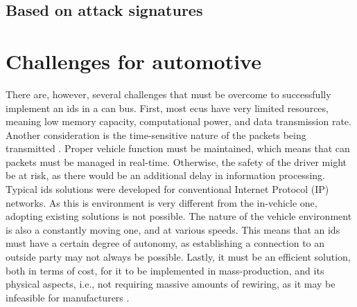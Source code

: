 \subsection{Based on attack signatures}

\section{Challenges for automotive}

There are, however, several challenges that must be overcome to successfully implement an \gls{ids} in a \gls{can} bus. First, most \glspl{ecu} have very limited resources, meaning low memory capacity, computational power, and data transmission rate. Another consideration is the time-sensitive nature of the packets being transmitted \citep{hoppe2009applying}. Proper vehicle function must be maintained, which means that \gls{can} packets must be managed in real-time. Otherwise, the safety of the driver might be at risk, as there would be an additional delay in information processing. Typical \gls{ids} solutions were developed for conventional Internet Protocol (IP) networks. As this is environment is very different from the in-vehicle one, adopting existing solutions is not possible. The nature of the vehicle environment is also a constantly moving one, and at various speeds. This means that an \gls{ids} must have a certain degree of autonomy, as establishing a connection to an outside party may not always be possible. Lastly, it must be an efficient solution, both in terms of cost, for it to be implemented in mass-production, and its physical aspects, i.e., not requiring massive amounts of rewiring, as it may be infeasible for manufacturers \citep{Lokman2019}.\par
